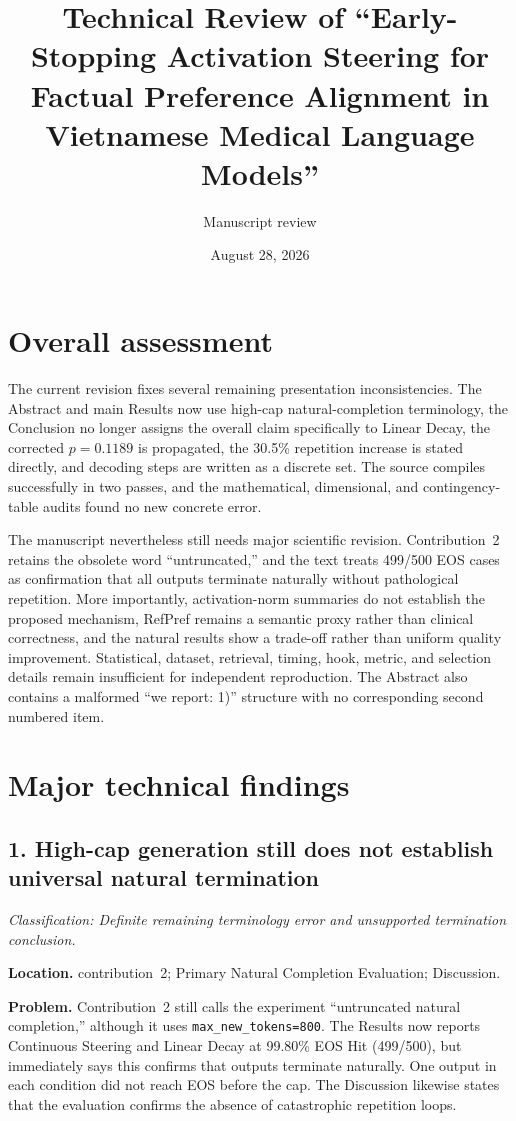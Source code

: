\documentclass[11pt]{article}
\title{Technical Review of ``Early-Stopping Activation Steering for Factual Preference Alignment in Vietnamese Medical Language Models''}
\author{Manuscript review}
\date{August 28, 2026}
\newcommand{\findinglabel}[1]{\textbf{#1}}
\newcommand{\classification}[1]{\textit{Classification: #1.}}
\begin{document}
\maketitle

\section*{Overall assessment}

The current revision fixes several remaining presentation inconsistencies.  The Abstract and main Results now use high-cap natural-completion terminology, the Conclusion no longer assigns the overall claim specifically to Linear Decay, the corrected $p=0.1189$ is propagated, the 30.5\% repetition increase is stated directly, and decoding steps are written as a discrete set.  The source compiles successfully in two passes, and the mathematical, dimensional, and contingency-table audits found no new concrete error.

The manuscript nevertheless still needs major scientific revision.  Contribution~2 retains the obsolete word ``untruncated,'' and the text treats 499/500 EOS cases as confirmation that all outputs terminate naturally without pathological repetition.  More importantly, activation-norm summaries do not establish the proposed mechanism, RefPref remains a semantic proxy rather than clinical correctness, and the natural results show a trade-off rather than uniform quality improvement.  Statistical, dataset, retrieval, timing, hook, metric, and selection details remain insufficient for independent reproduction.  The Abstract also contains a malformed ``we report: 1)'' structure with no corresponding second numbered item.

\section*{Major technical findings}

\subsection*{1. High-cap generation still does not establish universal natural termination}

\classification{Definite remaining terminology error and unsupported termination conclusion}

\findinglabel{Location.} contribution~2; Primary Natural Completion Evaluation; Discussion.

\findinglabel{Problem.} Contribution~2 still calls the experiment ``untruncated natural completion,'' although it uses \texttt{max\_new\_tokens=800}.  The Results now reports Continuous Steering and Linear Decay at 99.80\% EOS Hit (499/500), but immediately says this confirms that outputs terminate naturally.  One output in each condition did not reach EOS before the cap.  The Discussion likewise states that the evaluation confirms the absence of catastrophic repetition loops.
\end{document}
